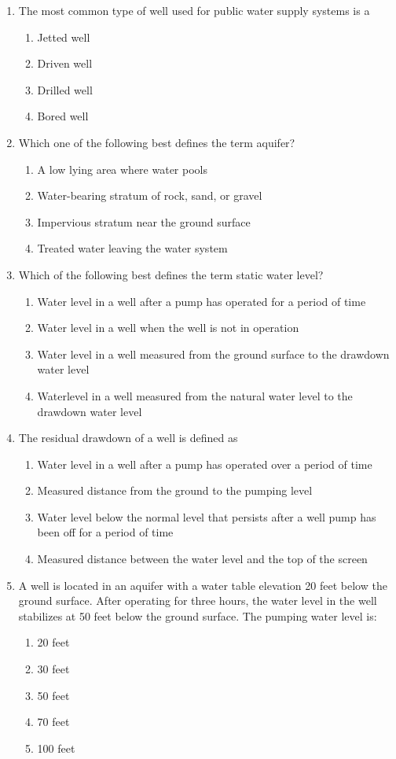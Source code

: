 \begin{enumerate}
\item The most common type of well used for public water supply systems is a
\begin{enumerate}
\item Jetted well
\item Driven well
\item Drilled well
\item Bored well
\end{enumerate}


\item Which one of the following best defines the term aquifer? 
\begin{enumerate}
\item A low lying area where water pools
\item Water-bearing stratum of rock, sand, or gravel 
\item Impervious stratum near the ground surface 
\item Treated water leaving the water system
\end{enumerate}

\item Which of the following best defines the term static water level?
\begin{enumerate}
\item Water level in a well after a pump has operated for a period of time
\item Water level in a well when the well is not in operation
\item Water level in a well measured from the ground surface to the drawdown water level
\item Waterlevel in a well measured from the natural water level to the drawdown water level
\end{enumerate}

\item The residual drawdown of a well is defined as
\begin{enumerate}
\item Water level in a well after a pump has operated over a period of time
\item Measured distance from the ground to the pumping level
\item Water level below the normal level that persists after a well pump has been off for a period of time
\item Measured distance between the water level and the top of the screen
\end{enumerate}

\item A well is located in an aquifer with a water table elevation 20 feet below the ground surface. After operating for three hours, the water level in the well stabilizes at 50 feet below the ground surface. The pumping water level is:
\begin{enumerate}
\item 20 feet
\item 30 feet
\item 50 feet
\item 70 feet
\item 100 feet
\end{enumerate}


\end{enumerate}
